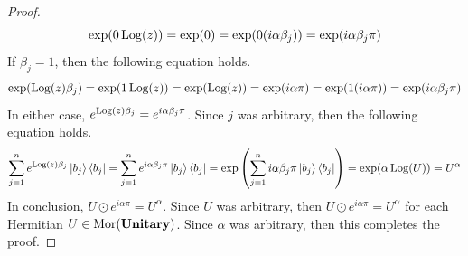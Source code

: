 \begin{proof}
\begin{equation*}
        \exp( 0 \operatorname{Log}(z) )
        =
        \exp( 0 )
        =
        \exp( 0 (i\alpha\beta_j) )
        =
        \exp( i\alpha\beta_j\pi )
    \end{equation*}
    If $\beta_j = 1$, then the following equation holds.
    \begin{equation*}
        \exp( \operatorname{Log}(z)\beta_j )
        =
        \exp( 1 \operatorname{Log}(z) )
        =
        \exp( \operatorname{Log}(z) )
        =
        \exp( i\alpha\pi )
        =
        \exp( 1 (i\alpha\pi) )
        =
        \exp( i\alpha\beta_j\pi )
    \end{equation*}
    In either case, $e^{\operatorname{Log}(z)\beta_j} = e^{i\alpha\beta_j\pi}$.
    Since $j$ was arbitrary, then the following equation holds.
    \begin{align*}
        \sum_{j=1}^n e^{\operatorname{Log}(z)\beta_j} \ket{b_j} \bra{b_j}
        =
        \sum_{j=1}^n e^{i\alpha\beta_j\pi} \ket{b_j} \bra{b_j}
        =
        \exp\left( \sum_{j=1}^n i\alpha\beta_j\pi \ket{b_j} \bra{b_j} \right)
        =
        \exp( \alpha \operatorname{Log}( U ) )
        =
        U^\alpha
    \end{align*}
    In conclusion, $U \odot e^{i\alpha\pi} = U^\alpha$.
    Since $U$ was arbitrary, then $U \odot e^{i\alpha\pi} = U^\alpha$ for each Hermitian $U \in \operatorname{Mor}( \mathbf{Unitary} )$.
    Since $\alpha$ was arbitrary, then this completes the proof.
\end{proof}